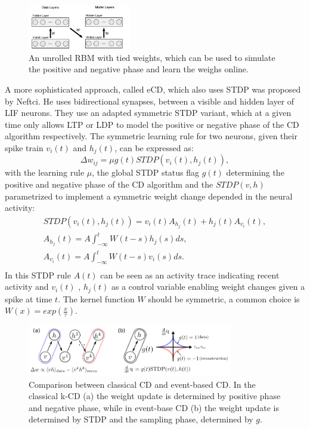 \begin{figure}
	\centering
    	\includegraphics[width=0.4\textwidth]{imgs/evtCD.png} 
    \caption{An unrolled RBM with tied weights, which can be used to simulate the positive and negative phase and learn the weighs online.}
	\label{fig:evtCD}
\end{figure}

A more sophisticated approach, called eCD, which also uses STDP was proposed by Neftci.
He uses bidirectional synapses, between a visible and hidden layer of LIF neurons.
They use an adapted symmetric STDP variant, which at a given time only allows LTP or LDP to model the positive or negative phase of the CD algorithm respectively. 
The symmetric learning rule for two neurons, given their spike train $v_i(t)$ and $h_j(t)$, can be expressed as:
\[
\Delta w_{ij} = \mu g(t) STDP(v_i(t), h_j(t)),
\]
with the learning rule $\mu$, the global STDP status flag $g(t)$ determining the positive and negative phase of the CD algorithm and the $STDP(v, h)$ parametrized to implement a symmetric weight change depended in the neural activity:
\[
\begin{split}
STDP(v_i(t), h_j(t)) = v_i(t) A_{h_j}(t) + h_j(t) A_{v_i}(t), \\
A_{h_j}(t) = A \int_{- \infty}^t W(t-s) h_j(s) ds, \\ 
A_{v_i}(t) = A \int_{- \infty}^t W(t-s) v_i(s) ds. \\ 
\end{split}
\]
In this STDP rule $A(t)$ can be seen as an activity trace indicating recent activity and $v_i(t)$ , $h_j(t)$ as a control variable enabling weight changes given a spike at time $t$.    
The kernel function $W$ should be symmetric, a common choice is $W(x) = exp(\frac{x}{\tau})$. 

\begin{figure}
	\centering
    	\includegraphics[width=0.8\textwidth]{imgs/eCD2.png} 
    \caption{Comparison between classical CD and event-based CD. In the classical k-CD (a) the weight update is determined by positive phase and negative phase, while in event-base CD (b) the weight update is determined by STDP and the sampling phase, determined by $g$.}
	\label{fig:test}
\end{figure}
  
